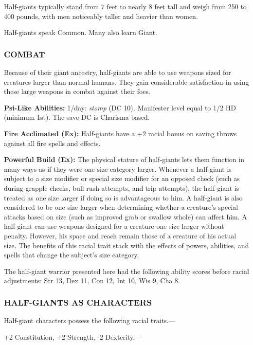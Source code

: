 \documentclass{article}
\begin{document}
Half-giants typically stand from 7 feet to nearly 8 feet tall and weigh from 250 
to 400 pounds, with men noticeably taller and heavier than women.

Half-giants speak Common. Many also learn Giant.

\subsubsection*{COMBAT}

Because of their giant ancestry, half-giants are able to use weapons sized for 
creatures larger than normal humans. They gain considerable satisfaction in using 
these large weapons in combat against their foes.

\textbf{Psi-Like Abilities:} 1/day: \textit{stomp }(DC 10)\textit{. }Manifester 
level equal to 1/2 HD (minimum 1st). The save DC is Charisma-based.

\textbf{Fire Acclimated (Ex): }Half-giants have a +2 racial bonus on saving throws 
against all fire spells and effects. 

\textbf{Powerful Build (Ex):} The physical stature of half-giants lets them function 
in many ways as if they were one size category larger. Whenever a half-giant is 
subject to a size modifier or special size modifier for an opposed check (such 
as during grapple checks, bull rush attempts, and trip attempts), the half-giant 
is treated as one size larger if doing so is advantageous to him. A half-giant 
is also considered to be one size larger when determining whether a creature's 
special attacks based on size (such as improved grab or swallow whole) can affect 
him. A half-giant can use weapons designed for a creature one size larger without 
penalty. However, his space and reach remain those of a creature of his actual 
size. The benefits of this racial trait stack with the effects of powers, abilities, 
and spells that change the subject's size category.

The half-giant warrior presented here had the following ability scores before racial 
adjustments: Str 13, Dex 11, Con 12, Int 10, Wis 9, Cha 8.

\subsubsection*{HALF-GIANTS AS CHARACTERS}

Half-giant characters possess the following racial traits.--- 

\parindent=3pt
+2 Constitution, +2 Strength, -2 Dexterity.---
\end{document}
